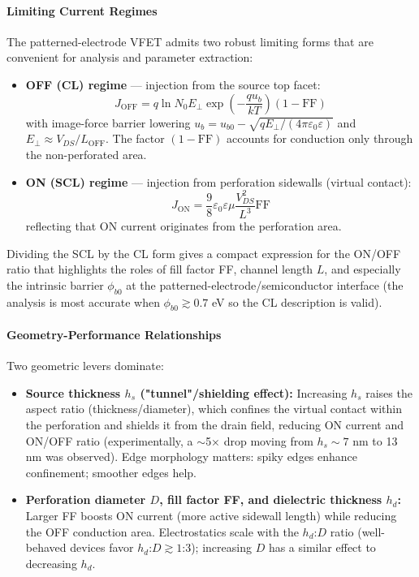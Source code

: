 \documentclass{article}
\begin{document}
\paragraph{Limiting Current Regimes}
The patterned-electrode VFET admits two robust limiting forms that are convenient for analysis and parameter extraction:

\begin{itemize}
    \item \textbf{OFF (CL) regime} — injection from the source top facet:
    \begin{equation}
    J_{\mathrm{OFF}} = q \ln N_0 E_\perp \exp\left(-\frac{q u_b}{kT}\right) (1-\text{FF})
    \end{equation}
    with image-force barrier lowering $u_b = u_{b0}-\sqrt{qE_\perp/(4\pi\varepsilon_0\varepsilon)}$ and $E_\perp \approx V_{DS}/L_{\mathrm{OFF}}$. The factor $(1-\text{FF})$ accounts for conduction only through the non-perforated area.
    
    \item \textbf{ON (SCL) regime} — injection from perforation sidewalls (virtual contact):
    \begin{equation}
    J_{\mathrm{ON}} = \frac{9}{8} \varepsilon_0\varepsilon \mu \frac{V_{DS}^2}{L^{3}} \text{FF}
    \end{equation}
    reflecting that ON current originates from the perforation area.
\end{itemize}

Dividing the SCL by the CL form gives a compact expression for the ON/OFF ratio that highlights the roles of fill factor FF, channel length $L$, and especially the intrinsic barrier $\phi_{b0}$ at the patterned-electrode/semiconductor interface (the analysis is most accurate when $\phi_{b0} \gtrsim 0.7$ eV so the CL description is valid).

\paragraph{Geometry-Performance Relationships}
Two geometric levers dominate:
\begin{itemize}
    \item \textbf{Source thickness $h_s$ ("tunnel"/shielding effect):} Increasing $h_s$ raises the aspect ratio (thickness/diameter), which confines the virtual contact within the perforation and shields it from the drain field, reducing ON current and ON/OFF ratio (experimentally, a $\sim$5× drop moving from $h_s \sim 7$ nm to 13 nm was observed). Edge morphology matters: spiky edges enhance confinement; smoother edges help.
    
    \item \textbf{Perforation diameter $D$, fill factor FF, and dielectric thickness $h_d$:} Larger FF boosts ON current (more active sidewall length) while reducing the OFF conduction area. Electrostatics scale with the $h_d$:$D$ ratio (well-behaved devices favor $h_d$:$D \gtrsim 1$:3); increasing $D$ has a similar effect to decreasing $h_d$.
\end{itemize}
\end{document}
